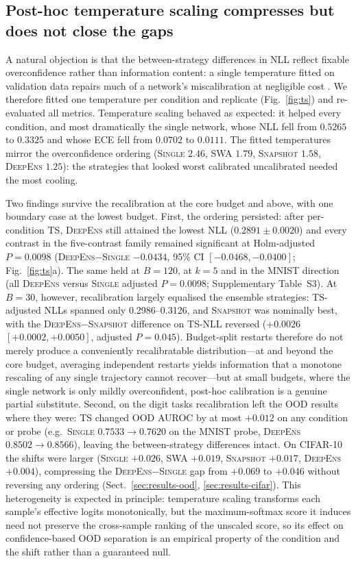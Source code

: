 \documentclass[11pt,a4paper]{article}
\newcommand{\deepens}{\textsc{DeepEns}}
\newcommand{\snapshot}{\textsc{Snapshot}}
\newcommand{\swa}{\textsc{SWA}}
\newcommand{\single}{\textsc{Single}}
\newcommand{\ts}{\textsc{TS}}
\begin{document}
\subsection{Post-hoc temperature scaling compresses but does not close the
gaps}\label{sec:results-ts}

A natural objection is that the between-strategy differences in NLL reflect
fixable overconfidence rather than information content: a single temperature
fitted on validation data repairs much of a network's miscalibration at
negligible cost \citep{guo2017}. We therefore fitted one temperature per
condition and replicate (Fig.~\ref{fig:ts}) and re-evaluated all metrics.
Temperature scaling behaved as expected: it helped every condition, and
most dramatically the single network, whose NLL fell from $0.5265$ to
$0.3325$ and whose ECE fell from $0.0702$ to $0.0111$. The fitted
temperatures mirror the overconfidence ordering (\single{} $2.46$,
\swa{} $1.79$, \snapshot{} $1.58$, \deepens{} $1.25$): the strategies that
looked worst calibrated uncalibrated needed the most cooling.

Two findings survive the recalibration at the core budget and above,
with one boundary case at the lowest budget. First, the ordering
persisted: after per-condition \ts{}, \deepens{} still attained the lowest
NLL ($0.2891 \pm 0.0020$) and every contrast in the five-contrast family
remained significant at Holm-adjusted $P=0.0098$ (\deepens$-$\single{}
$-0.0434$, 95\% CI $[-0.0468,-0.0400]$; Fig.~\ref{fig:ts}a). The same
held at $B=120$, at $k=5$ and in the MNIST direction (all \deepens{}
versus \single{} adjusted $P=0.0098$; Supplementary Table~S3). At
$B=30$, however, recalibration largely equalised the ensemble
strategies: \ts-adjusted NLLs spanned only 0.2986--0.3126, and \snapshot{}
was nominally best, with the \deepens$-$\snapshot{} difference on
\ts-NLL reversed ($+0.0026$ $[+0.0002,+0.0050]$, adjusted $P=0.045$).
Budget-split restarts therefore do not merely produce a conveniently
recalibratable distribution---at and beyond the core budget, averaging
independent restarts yields information that a monotone rescaling of any
single trajectory cannot recover---but at small budgets, where the single
network is only mildly overconfident, post-hoc calibration is a genuine
partial substitute. Second, on the digit tasks recalibration left the
OOD results where they were: \ts{} changed OOD AUROC by at most $+0.012$
on any condition or probe (e.g.\ \single{} $0.7533 \rightarrow 0.7620$ on
the MNIST probe, \deepens{} $0.8502 \rightarrow 0.8566$), leaving the
between-strategy differences intact. On CIFAR-10 the shifts were larger
(\single{} $+0.026$, \swa{} $+0.019$, \snapshot{} $+0.017$, \deepens{}
$+0.004$), compressing the \deepens$-$\single{} gap from $+0.069$ to
$+0.046$ without reversing any ordering
(Sect.~\ref{sec:results-ood}, \ref{sec:results-cifar}). This heterogeneity
is expected in principle: temperature scaling transforms each sample's
effective logits monotonically, but the maximum-softmax score it induces
need not preserve the cross-sample ranking of the unscaled score, so its
effect on confidence-based OOD separation is an empirical property of the
condition and the shift rather than a guaranteed null.
\end{document}
